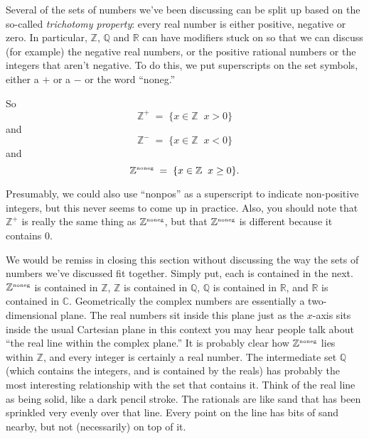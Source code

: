 \documentclass[10pt,]{book}
\theoremstyle{plain}
\theoremstyle{definition}
\theoremstyle{definition}
\numberwithin{equation}{section}
\renewcommand{\Naturals}{{\mathbb Z}^{\mbox{\tiny noneg}} }
\newcommand{\suchthat}{\;  \;}
\newcommand{\Naturals}{{\mathbb N}}
\newcommand{\Integers}{{\mathbb Z}}
\newcommand{\Znoneg}{{\mathbb Z}^{\mbox{\tiny noneg}}}
\newcommand{\Rationals}{{\mathbb Q}}
\newcommand{\Reals}{{\mathbb R}}
\newcommand{\Complexes}{{\mathbb C}}
\newcommand{\lt}{ < }
\begin{document}
    Several of the sets of numbers we've been discussing can be split
    up based on the so-called \emph{trichotomy property}:
    every real number is either positive, negative or zero. In particular,
    \(\Integers\), \(\Rationals\) and \(\Reals\) can have modifiers stuck on so
    that we can discuss (for example) the negative real numbers, or the
    positive rational numbers or the integers that aren't negative.
    To do this, we put superscripts on the set symbols, either a \(+\)
    or a \(-\) or the word ``noneg.''
\par

    So
    \begin{equation*}
      \Integers^+ \; = \; \{ x \in \Integers \suchthat x > 0 \}
    \end{equation*}
    and
    \begin{equation*}
      \Integers^- \; = \; \{ x \in \Integers \suchthat x \lt  0 \}
    \end{equation*}
    and
    \begin{equation*}
      \Znoneg \; = \; 
      \{ x \in \Integers \suchthat x \geq 0 \}.
    \end{equation*}
\par

    Presumably, we could also use ``nonpos'' as a superscript to indicate
    non-positive integers, but this never seems to come up in practice.
    Also, you should note that \(\Integers^+\) is really the same thing
    as \(\Naturals\), but that \(\Znoneg\) is different because it
    contains \(0\).
\par

    We would be remiss in closing this section without discussing the
    way the sets of numbers we've discussed fit together. Simply put,
    each is contained in the next. \(\Naturals\) is contained in \(\Integers\),
    \(\Integers\) is contained in \(\Rationals\), \(\Rationals\) is contained
    in \(\Reals\), and \(\Reals\) is contained in \(\Complexes\).
    Geometrically the complex numbers are essentially a two-dimensional
    plane. The real numbers sit inside this plane just as the \(x\)-axis
    sits inside the usual Cartesian plane \textemdash{} in this context you may
    hear people talk about ``the real line within the complex plane.''
    It is probably clear how \(\Naturals\) lies within \(\Integers\), and
    every integer is certainly a real number. The intermediate set
    \(\Rationals\) (which contains the integers, and is contained by the
    reals) has probably the most interesting relationship with the
    set that contains it. Think of the real line as being solid, like
    a dark pencil stroke. The rationals are like sand that has been
    sprinkled very evenly over that line. Every point on the line
    has bits of sand nearby, but not (necessarily) on top of it.
\typeout{************************************************}
\typeout{************************************************}
\end{document}
